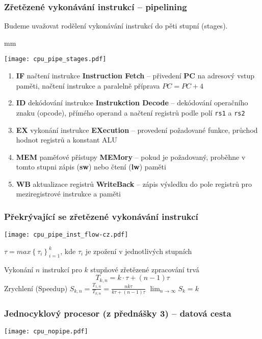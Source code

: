 \documentclass{beamer}
\begin{document}
\begin{frame}
\frametitle{Zřetězené vykonávání instrukcí -- pipelining}

Budeme uvažovat rodělení vykonávání instrukcí do pěti stupní (stages).

 mm

{
\centering
\texttt{[image: cpu\_pipe\_stages.pdf]}
}

\begin{enumerate}
 \item \textbf{IF} načtení instrukce \textbf{Instruction Fetch} -- přivedení \textbf{PC} na adresový vstup paměti, načtení instrukce a paralelně příprava $PC = PC + 4$
 \item \textbf{ID} dekódování instrukce \textbf{Instrukction Decode} -- dekódování operačního znaku (opcode), přímého operand a načtení registrů podle polí \texttt{rs1} a \texttt{rs2}
 \item \textbf{EX} vykonání instrukce \textbf{EXecution} -- provedení požadované funkce, průchod hodnot registrů a konstant ALU
 \item \textbf{MEM} paměťové přístupy \textbf{MEMory} -- pokud je požadovaný, proběhne v tomto stupni zápis (\textbf{sw}) nebo čtení (\textbf{lw}) paměti
 \item \textbf{WB} aktualizace registrů \textbf{WriteBack} -- zápis výsledku do pole registrů pro meziregistrové instrukce a paměti
\end{enumerate}

\end{frame}

\begin{frame}
\frametitle{Překrývající se zřetězené vykonávání instrukcí}
\texttt{[image: cpu\_pipe\_inst\_flow-cz.pdf]}

$\tau = max{\left\lbrace \tau_i \right\rbrace}^k_{i=1}$,  kde $\tau_i$ je zpožení v jednotlivých stupních

Vykonání $n$ instrukcí pro $k$ stupňové zřetězené zpracování trvá
$$T_{k,n} = k \cdot \tau + (n - 1) \tau$$
Zrychlení (Speedup)
\hskip 7mm
$S_{k,n} = \frac{T_{1,n}}{T_{k,n}} = \frac{n k \tau}{k \tau + (n - 1) \tau}$
\hskip 7mm
$\lim_{n \rightarrow \infty} S_k = k$

\end{frame}

\begin{frame}
\frametitle{Jednocyklový procesor (z přednášky 3) -- datová cesta}
\texttt{[image: cpu\_nopipe.pdf]}
\end{frame}
\end{document}
